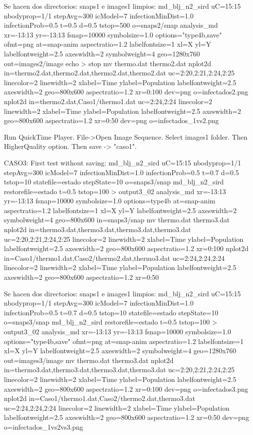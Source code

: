 Se hacen dos directorios: snaps1 e images1 limpios:
md_blj_n2_sird uC=15:15 nbodyprop=1/1 stepAvg=300 icModel=7 infectionMinDist=1.0 infectionProb=0.5 t=0.5 d=0.5 tstop=500 o=snaps2/snap%
analysis_md xr=-13:13 yr=-13:13 fsnap=10000 symbolsize=1.0 options="type4b,save" ofmt=png at=snap-anim  aspectratio=1.2 labelfontsize=1 xl=X yl=Y labelfontweight=2.5 axeswidth=2 symbolweight=4 geo=1280x760 out=images2/image%
echo > stop
mv thermo.dat thermo2.dat
nplot2d in=thermo2.dat,thermo2.dat,thermo2.dat,thermo2.dat uc=2:20,2:21,2:24,2:25 linecolor=2 linewidth=2 xlabel=Time ylabel=Population labelfontweight=2.5 axeswidth=2 geo=800x600 aspectratio=1.2 xr=0:100 dev=png o=infectados2.png
nplot2d in=thermo2.dat,Caso1/thermo1.dat uc=2:24,2:24 linecolor=2 linewidth=2 xlabel=Time ylabel=Population labelfontweight=2.5 axeswidth=2 geo=800x600 aspectratio=1.2 xr=0:50 dev=png o=infectados_1vs2.png

Run QuickTime Player.  File->Open Image Sequence. Select images1 folder. Then HigherQuality option. Then save -> "caso1".


CASO3:
First test without saving:
md_blj_n2_sird uC=15:15 nbodyprop=1/1 stepAvg=300 icModel=7 infectionMinDist=1.0 infectionProb=0.5 t=0.7 d=0.5 tstop=10 statefile=estado stepState=10  o=snaps3/snap%
md_blj_n2_sird restorefile=estado t=0.5 tstop=100 > output3_02
analysis_md xr=-13:13 yr=-13:13 fsnap=10000 symbolsize=1.0 options=type4b at=snap-anim  aspectratio=1.2 labelfontsize=1 xl=X yl=Y labelfontweight=2.5 axeswidth=2 symbolweight=4 geo=800x600 in=snaps3/snap%
mv thermo.dat thermo3.dat
nplot2d in=thermo3.dat,thermo3.dat,thermo3.dat,thermo3.dat uc=2:20,2:21,2:24,2:25 linecolor=2 linewidth=2 xlabel=Time ylabel=Population labelfontweight=2.5 axeswidth=2 geo=800x600 aspectratio=1.2 xr=0:100
nplot2d in=Caso1/thermo1.dat,Caso2/thermo2.dat,thermo3.dat uc=2:24,2:24,2:24 linecolor=2 linewidth=2 xlabel=Time ylabel=Population labelfontweight=2.5 axeswidth=2 geo=800x600 aspectratio=1.2 xr=0:50


Se hacen dos directorios: snaps1 e images1 limpios:
md_blj_n2_sird uC=15:15 nbodyprop=1/1 stepAvg=300 icModel=7 infectionMinDist=1.0 infectionProb=0.5 t=0.7 d=0.5 tstop=10 statefile=estado stepState=10  o=snaps3/snap%
md_blj_n2_sird restorefile=estado t=0.5 tstop=100 > output3_02
analysis_md xr=-13:13 yr=-13:13 fsnap=10000 symbolsize=1.0 options="type4b,save" ofmt=png at=snap-anim  aspectratio=1.2 labelfontsize=1 xl=X yl=Y labelfontweight=2.5 axeswidth=2 symbolweight=4 geo=1280x760 out=images3/image%
mv thermo.dat thermo3.dat
nplot2d in=thermo3.dat,thermo3.dat,thermo3.dat,thermo3.dat uc=2:20,2:21,2:24,2:25 linecolor=2 linewidth=2 xlabel=Time ylabel=Population labelfontweight=2.5 axeswidth=2 geo=800x600 aspectratio=1.2 xr=0:100 dev=png o=infectados3.png
nplot2d in=Caso1/thermo1.dat,Caso2/thermo2.dat,thermo3.dat uc=2:24,2:24,2:24 linecolor=2 linewidth=2 xlabel=Time ylabel=Population labelfontweight=2.5 axeswidth=2 geo=800x600 aspectratio=1.2 xr=0:50 dev=png o=infectados_1vs2vs3.png

